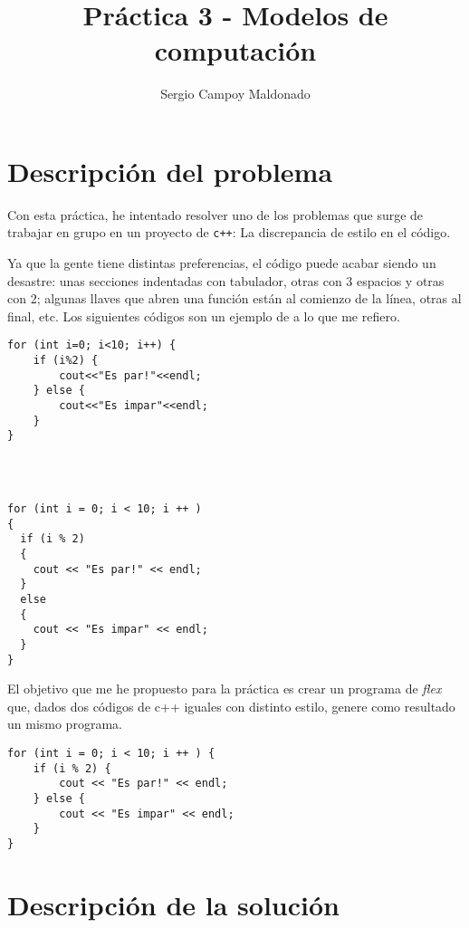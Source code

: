 \documentclass[10pt]{article}
\title{Práctica 3 - Modelos de computación}
\author{Sergio Campoy Maldonado}
\begin{document}
    

    \tableofcontents

    \pagebreak

    \section{Descripción del problema}

    Con esta práctica, he intentado resolver uno de los problemas que surge de trabajar en grupo en un proyecto de \texttt{c++}: La discrepancia de estilo en el código.
    
    Ya que la gente tiene distintas preferencias, el código puede acabar siendo un desastre: unas secciones indentadas con tabulador, otras con 3 espacios y otras con 2; algunas llaves que abren una función están al comienzo de la línea, otras al final, etc. Los siguientes códigos son un ejemplo de a lo que me refiero.

    \begin{multicols}{2}
        \begin{lstlisting}
for (int i=0; i<10; i++) {
    if (i%2) {
        cout<<"Es par!"<<endl;
    } else {
        cout<<"Es impar"<<endl;
    }
}




        \end{lstlisting}
        \columnbreak
        \begin{lstlisting}
for (int i = 0; i < 10; i ++ )
{
  if (i % 2)
  {
    cout << "Es par!" << endl;
  }
  else
  {
    cout << "Es impar" << endl;
  }
}
        \end{lstlisting}
    \end{multicols}

    El objetivo que me he propuesto para la práctica es crear un programa de \emph{flex} que, dados dos códigos de c++ iguales con distinto estilo, genere como resultado un mismo programa.

    \begin{lstlisting}
for (int i = 0; i < 10; i ++ ) {
    if (i % 2) {
        cout << "Es par!" << endl;
    } else { 
        cout << "Es impar" << endl;
    }
}
    \end{lstlisting}

    \pagebreak

    \section{Descripción de la solución}
\end{document}
